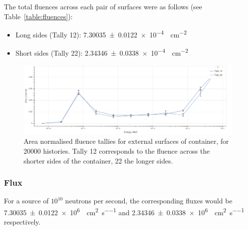 \documentclass{article}
\begin{document}
    The total fluences across each pair of surfaces were as follows (see Table~\ref{table:fluences}):
    \begin{itemize}
      \item Long sides (Tally 12): \SI{7.30035\pm 0.0122e-4}{\neutron\per\cm^2}
      \item Short sides (Tally 22): \SI{2.34346 \pm 0.0338e-4}{\neutron\per\cm^2}
    \end{itemize}
    \begin{figure}[htb]
      \includegraphics[width=\textwidth]{tallies_20k_norm.png}
      \caption{Area normalised fluence tallies for external surfaces of container, for \num{20000} histories. Tally 12 corresponds to the fluence across the shorter sides of the container, 22 the longer sides.}
      \label{fig:tallies_20000_norm}
    \end{figure}

    \subsubsection{Flux}
    For a source of $10^{10}$ neutrons per second, the corresponding fluxes would be \SI{7.30035\pm 0.0122e+6}{\neutron\per\cm^2\per\second} and \SI{2.34346 \pm 0.0338e+6}{\neutron\per\cm^2\per\second} respectively.
\end{document}
